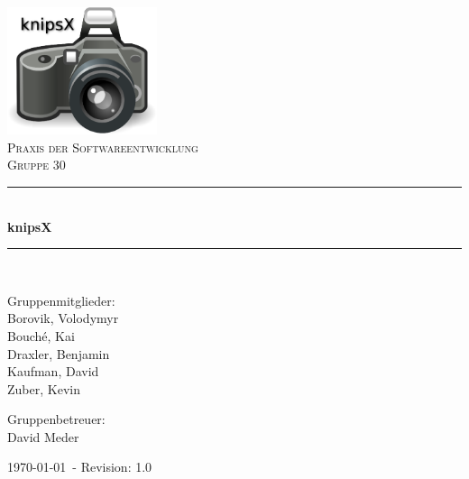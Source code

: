 
\newcommand{\HRule}{\rule{\linewidth}{0.5mm}}

\begin{titlepage}
 
\begin{center}
 
 
\includegraphics[width=0.33\textwidth]{images/cover.eps}\\[3cm]
 
\textsc{\LARGE Praxis der Softwareentwicklung}\\[1.5cm]
 
\textsc{\Large Gruppe 30 }\\[0.5cm]
 
 
\HRule \\[0.4cm]
{ \huge \bfseries knipsX}\\[0.4cm]
 
\HRule \\[1.5cm]
 
\begin{minipage}{0.4\textwidth}
\begin{flushleft} \large

Gruppenmitglieder: \\
Borovik, Volodymyr \\
Bouché, Kai \\
Draxler, Benjamin \\
Kaufman, David \\
Zuber, Kevin

\end{flushleft}
\end{minipage}
\begin{minipage}{0.4\textwidth}
\begin{flushright} \large
Gruppenbetreuer: \\
David Meder
\end{flushright}
\end{minipage} 
\vfill

{\large \today ~- Revision: 1.0}
 
\end{center}
\end{titlepage}